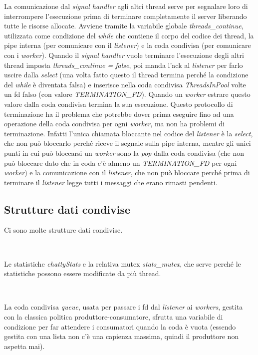 \documentclass[a4paper]{article}
\theoremstyle{theorem}
\theoremstyle{remark}
\theoremstyle{definition}
\theoremstyle{corollary}
\theoremstyle{lemma}
\newcommand\codeName[1]{%
	\textit{#1}}
\begin{document}
La comunicazione dal \codeName{signal handler} agli altri thread serve per segnalare loro di interrompere l'esecuzione prima di terminare completamente il server liberando tutte le risorse allocate. Avviene tramite la variabile globale \codeName{threads\_continue}, utilizzata come condizione del \codeName{while} che contiene il corpo del codice dei thread, la pipe interna (per comunicare con il \codeName{listener}) e la coda condivisa (per comunicare con i \codeName{worker}). Quando il \codeName{signal handler} vuole terminare l'esecuzione degli altri thread imposta \codeName{threads\_continue = false}, poi manda l'ack al \codeName{listener} per farlo uscire dalla \codeName{select} (una volta fatto questo il thread termina perché la condizione del \codeName{while} è diventata falsa) e inserisce nella coda condivisa \codeName{ThreadsInPool} volte un fd falso (con valore \codeName{TERMINATION\_FD}). Quando un \codeName{worker} estrare questo valore dalla coda condivisa termina la sua esecuzione.
Questo protocollo di terminazione ha il problema che potrebbe dover prima eseguire fino ad una operazione della coda condivisa per ogni \codeName{worker}, ma non ha problemi di terminazione. Infatti l'unica chiamata bloccante nel codice del \codeName{listener} è la \codeName{select}, che non può bloccarlo perché riceve il segnale sulla pipe interna, mentre gli unici punti in cui può bloccarsi un \codeName{worker} sono la \codeName{pop} dalla coda condivisa (che non può bloccare dato che in coda c'è almeno un \codeName{TERMINATION\_FD} per ogni \codeName{worker}) e la comunicazione con il \codeName{listener}, che non può bloccare perché prima di terminare il \codeName{listener} legge tutti i messaggi che erano rimasti pendenti.

\subsection{Strutture dati condivise}\label{strutture-dati}
Ci sono molte strutture dati condivise.

\

Le statistiche \codeName{chattyStats} e la relativa mutex \codeName{stats\_mutex}, che serve perché le statistiche possono essere modificate da più thread.

\

La coda condivisa \codeName{queue}, usata per passare i fd dal \codeName{listener} ai \codeName{workers}, gestita con la classica politica produttore-consumatore, sfrutta una variabile di condizione per far attendere i consumatori quando la coda è vuota (essendo gestita con una lista non c'è una capienza massima, quindi il produttore non aspetta mai).
\end{document}
